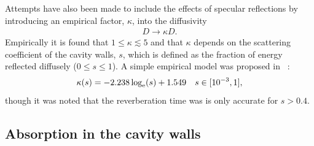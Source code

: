 \documentclass[a4paper]{article}
\numberwithin{equation}{section}
\begin{document}
Attempts have also been made to include the effects of specular reflections by
introducing an empirical factor, ${\kappa}$, into the diffusivity~\citep{Foy2009} 
\begin{align}
\label{eq:kappa}
D \rightarrow \kappa D .
\end{align}
Empirically it is found that $1\leq\kappa\lesssim 5$ and that $\kappa$ depends on the 
scattering coefficient of the cavity walls, $s$, which is defined as the fraction
of energy reflected diffusely ($0 \leq s \leq 1$). A simple empirical model was proposed
in ~\citep{Foy2009}:
\begin{align}
\kappa(s) = -2.238\log_{\mathrm{e}}(s) + 1.549 \,\,\,\,\,\,s\in [10^{-3},1],
\end{align}
though it was noted that the reverberation time was is only accurate for $s>0.4$.

\subsection[Absorption in the cavity walls]{Absorption in the cavity walls}
\label{sc:sum:abs}
\end{document}
